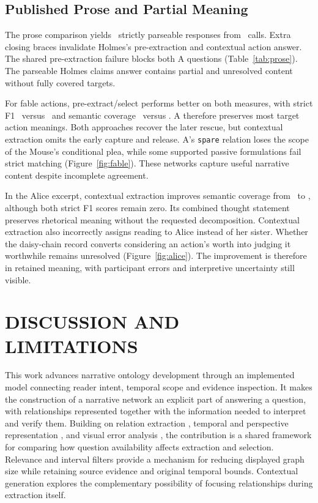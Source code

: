 \documentclass[a4paper,twoside]{article}
\begin{document}
\subsection{Published Prose and Partial Meaning}
\noindent The prose comparison yields \ProseParsed\ strictly parseable responses from \ProseCalls\ calls. Extra closing braces invalidate Holmes's pre-extraction and contextual action answer. The shared pre-extraction failure blocks both A questions (Table~\ref{tab:prose}). The parseable Holmes claims answer contains partial and unresolved content without fully covered targets.



For fable actions, pre-extract/select performs better on both measures, with strict F1 \FableAFone\ versus \FableBFone\ and semantic coverage \FableACoverage\ versus \FableBCoverage. A therefore preserves most target action meanings. Both approaches recover the later rescue, but contextual extraction omits the early capture and release. A's \texttt{spare} relation loses the scope of the Mouse's conditional plea, while some supported passive formulations fail strict matching (Figure~\ref{fig:fable}). These networks capture useful narrative content despite incomplete agreement.

In the Alice excerpt, contextual extraction improves semantic coverage from \AliceACoverage\ to \AliceBCoverage, although both strict F1 scores remain zero. Its combined thought statement preserves rhetorical meaning without the requested decomposition. Contextual extraction also incorrectly assigns reading to Alice instead of her sister. Whether the daisy-chain record converts considering an action's worth into judging it worthwhile remains unresolved (Figure~\ref{fig:alice}). The improvement is therefore in retained meaning, with participant errors and interpretive uncertainty still visible.









\section{\uppercase{Discussion and Limitations}}

\noindent This work advances narrative ontology development through an implemented model connecting reader intent, temporal scope and evidence inspection. It makes the construction of a narrative network an explicit part of answering a question, with relationships represented together with the information needed to interpret and verify them.
Building on relation extraction \cite{banko2007}, temporal and perspective representation \cite{time2017,fokkens2017}, and visual error analysis \cite{schneider2017}, the contribution is a shared framework for comparing how question availability affects extraction and selection. Relevance and interval filters provide a mechanism for reducing displayed graph size while retaining source evidence and original temporal bounds. Contextual generation explores the complementary possibility of focusing relationships during extraction itself.
\end{document}
